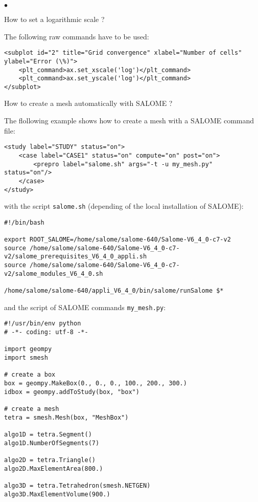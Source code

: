 \documentclass[a4paper,10pt,twoside]{csshortdoc}
\begin{document}
\begin{list}{$\bullet$}{}
\item How to set a logarithmic scale ?

The following raw commands have to be used:

\small
\begin{verbatim}
<subplot id="2" title="Grid convergence" xlabel="Number of cells" ylabel="Error (\%)">
    <plt_command>ax.set_xscale('log')</plt_command>
    <plt_command>ax.set_yscale('log')</plt_command>
</subplot>
\end{verbatim}
\normalsize

\item How to create a mesh automatically with SALOME ?

The flollowing example shows how to create a mesh with a SALOME command file:
\small
\begin{verbatim}
<study label="STUDY" status="on">
    <case label="CASE1" status="on" compute="on" post="on">
        <prepro label="salome.sh" args="-t -u my_mesh.py" status="on"/>
    </case>
</study>
\end{verbatim}
\normalsize

with the script \texttt{salome.sh} (depending of the local installation of
SALOME):
\small
\begin{verbatim}
#!/bin/bash

export ROOT_SALOME=/home/salome/salome-640/Salome-V6_4_0-c7-v2
source /home/salome/salome-640/Salome-V6_4_0-c7-v2/salome_prerequisites_V6_4_0_appli.sh
source /home/salome/salome-640/Salome-V6_4_0-c7-v2/salome_modules_V6_4_0.sh

/home/salome/salome-640/appli_V6_4_0/bin/salome/runSalome $*
\end{verbatim}
\normalsize

and the script of SALOME commands \texttt{my\_mesh.py}:
\small
\begin{verbatim}
#!/usr/bin/env python
# -*- coding: utf-8 -*-

import geompy
import smesh

# create a box
box = geompy.MakeBox(0., 0., 0., 100., 200., 300.)
idbox = geompy.addToStudy(box, "box")

# create a mesh
tetra = smesh.Mesh(box, "MeshBox")

algo1D = tetra.Segment()
algo1D.NumberOfSegments(7)

algo2D = tetra.Triangle()
algo2D.MaxElementArea(800.)

algo3D = tetra.Tetrahedron(smesh.NETGEN)
algo3D.MaxElementVolume(900.)


\end{verbatim}
\end{list}
\end{document}
